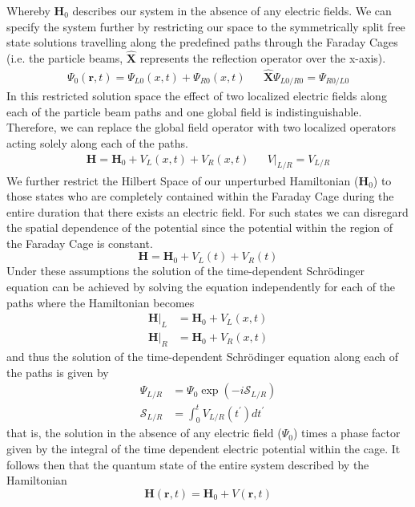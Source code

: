 \documentclass{article}
\begin{document}
Whereby $\bm{H}_{0}$ describes our system in the absence of any electric fields. We can specify the system further by restricting our space to the symmetrically split free state solutions travelling along the predefined paths through the Faraday Cages (i.e. the particle beams, $\hat{\bm{X}}$ represents the reflection operator over the x-axis).
\begin{align*}
  \Psi_{0}(\bm{r},t)=\Psi_{L0}(x,t) + \Psi_{R0}(x,t) && \hat{\bm{X}}\Psi_{L0/R0} = \Psi_{R0/L0}
\end{align*}
In this restricted solution space the effect of two localized electric fields along each of the particle beam paths and one global field is indistinguishable. Therefore, we can replace the global field operator with two localized operators acting solely along each of the paths.
\begin{align*}
  \bm{H} = \bm{H}_{0} + V_{L}(x,t) + V_{R}(x,t) && V|_{L/R} = V_{L/R}
\end{align*}
We further restrict the Hilbert Space of our unperturbed Hamiltonian ($\bm{H}_{0}$) to those states who are completely contained within the Faraday Cage during the entire duration that there exists an electric field. For such states we can disregard the spatial dependence of the potential since the potential within the region of the Faraday Cage is constant.
\begin{equation*}
  \bm{H} = \bm{H}_{0} + V_{L}(t) + V_{R}(t)
\end{equation*}
Under these assumptions the solution of the time-dependent Schrödinger equation can be achieved by solving the equation independently for each of the paths where the Hamiltonian becomes
\begin{align*}
  \bm{H}|_{L} &= \bm{H}_{0} + V_{L}(x,t)\\
  \bm{H}|_{R} &= \bm{H}_{0} + V_{R}(x,t)
\end{align*}
and thus the solution of the time-dependent Schrödinger equation along each of the paths is given by
\begin{align*}
  \Psi_{L/R} &= \Psi_{0} \exp(-i \mathcal{S}_{L/R})\\
  \mathcal{S}_{L/R} &= \int_{0}^{t} V_{L/R}(t^{\prime}) dt^{\prime} 
\end{align*}
that is, the solution in the absence of any electric field ($\Psi_{0}$) times a phase factor given by the integral of the time dependent electric potential within the cage. It follows then that the quantum state of the entire system described by the Hamiltonian
  \begin{equation*}
    \bm{H}(\bm{r}, t) = \bm{H}_{0} + V(\bm{r}, t)
  \end{equation*}
\end{document}
